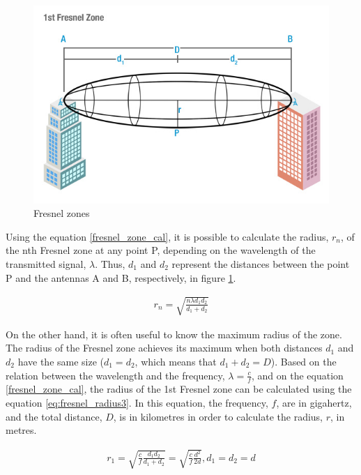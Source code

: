 \begin{figure}[H]
	\centering
	\includegraphics[scale=0.70]{figures/fresnel_zone.jpg}
	\caption{Fresnel zones}
	\label{fig:fresnel_zones}
\end{figure} 

Using the equation \ref{fresnel_zone_cal}, it is possible to calculate the radius, $r_n$, of the nth Fresnel zone at any point P, depending on the wavelength of the transmitted signal, $\lambda$. Thus, $d_1$ and $d_2$ represent the distances between the point P and the antennas A and B, respectively, in figure \ref{fig:fresnel_zones}.

\begin{align}
r_n = \sqrt{\frac{n \lambda d_1 d_2}{d_1+d_2}} \label{fresnel_zone_cal}
\end{align}

On the other hand, it is often useful to know the maximum radius of the zone. The radius of the Fresnel zone achieves its maximum when both distances $d_1$ and $d_2$ have the same size ($d_1=d_2$, which means that $d_1+d_2=D$). Based on the relation between the wavelength and the frequency, $\lambda = \frac{c}{f}$, and on the equation \ref{fresnel_zone_cal}, the radius of the 1st Fresnel zone can be calculated using the equation \ref{eq:fresnel_radius3}. In this equation, the frequency, $f$, are in gigahertz, and the total distance, $D$, is in kilometres in order to calculate the radius, $r$, in metres.

\begin{align}
r_1 = \sqrt{\frac{c}{f}\frac{d_1 d_2}{d_1+d_2}} = \sqrt{\frac{c}{f}\frac{d^2}{2d}}, d_1=d_2=d \label{eq:fresnel_radius1}
\end{align}

